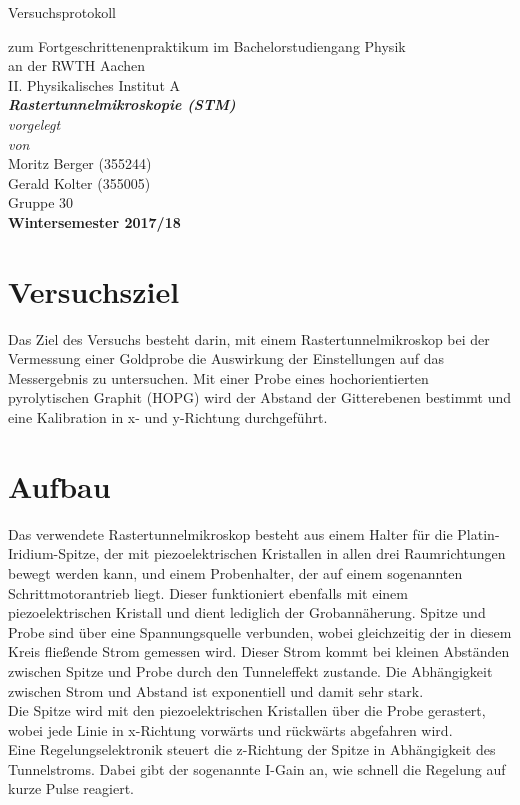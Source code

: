 \documentclass[12pt,a4paper]{article}
\author{Gerald}
\begin{document}
	\setlength{\parindent}{0pt} 
	\begin{center}
		{\LARGE Versuchsprotokoll}\\
		\begin{large}
			zum Fortgeschrittenenpraktikum im Bachelorstudiengang Physik\\[0.4cm]
			an der RWTH Aachen\\
			II. Physikalisches Institut A\\[5.5cm]
			\Large\textbf{\textsl{Rastertunnelmikroskopie (STM)}}\\[5.5cm]
			\normalsize\textit{vorgelegt\\von}\\[0.4cm]
			\large{Moritz Berger (355244)\\Gerald Kolter (355005)}\\Gruppe 30\\[2cm]
			\large \textbf{Wintersemester 2017/18}
		\end{large}
	\end{center}
	\newpage
	
	\tableofcontents
	\newpage

\section{Versuchsziel}
Das Ziel des Versuchs besteht darin, mit einem Rastertunnelmikroskop bei der Vermessung einer Goldprobe die Auswirkung der Einstellungen auf das Messergebnis zu untersuchen. Mit einer Probe eines hochorientierten pyrolytischen Graphit (HOPG) wird der Abstand der Gitterebenen bestimmt und eine Kalibration in x- und y-Richtung durchgeführt.

\section{Aufbau}
Das verwendete Rastertunnelmikroskop besteht aus einem Halter für die Platin-Iridium-Spitze, der mit piezoelektrischen Kristallen in allen drei Raumrichtungen bewegt werden kann, und einem Probenhalter, der auf einem sogenannten Schrittmotorantrieb liegt. Dieser funktioniert ebenfalls mit einem piezoelektrischen Kristall und dient lediglich der Grobannäherung. Spitze und Probe sind über eine Spannungsquelle verbunden, wobei gleichzeitig der in diesem Kreis fließende Strom gemessen wird. Dieser Strom kommt bei kleinen Abständen zwischen Spitze und Probe durch den Tunneleffekt zustande. Die Abhängigkeit zwischen Strom und Abstand ist exponentiell und damit sehr stark.\\
Die Spitze wird mit den piezoelektrischen Kristallen über die Probe gerastert, wobei jede Linie in x-Richtung vorwärts und rückwärts abgefahren wird.\\
Eine Regelungselektronik steuert die z-Richtung der Spitze in Abhängigkeit des Tunnelstroms. Dabei gibt der sogenannte I-Gain an, wie schnell die Regelung auf kurze Pulse reagiert.
\end{document}
